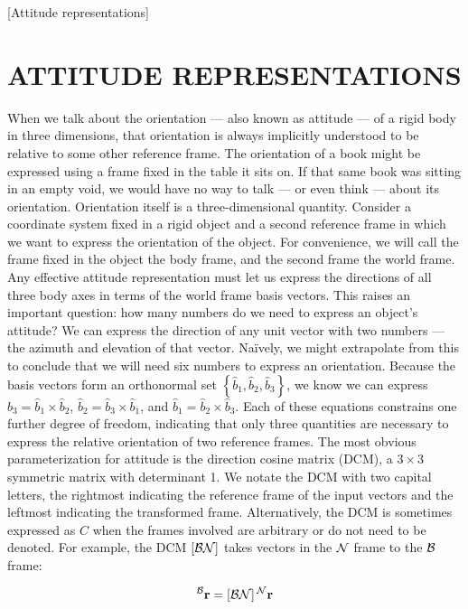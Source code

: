 [Attitude representations]

\chapter{ATTITUDE REPRESENTATIONS}

When we talk about the orientation ---  also known as attitude ---  of a rigid body in three dimensions, that orientation is always implicitly understood to be relative to some other reference frame. The orientation of a book might be expressed using a frame fixed in the table it sits on. If that same book was sitting in an empty void, we would have no way to talk ---  or even think ---  about its orientation. Orientation itself is a three-dimensional quantity. Consider a coordinate system fixed in a rigid object and a second reference frame in which we want to express the orientation of the object. For convenience, we will call the frame fixed in the object the body frame, and the second frame the world frame. Any effective attitude representation must let us express the directions of all three body axes in terms of the world frame basis vectors. This raises an important question: how many numbers do we need to express an object's attitude? We can express the direction of any unit vector with two numbers ---  the azimuth and elevation of that vector. Naïvely, we might extrapolate from this to conclude that we will need six numbers to express an orientation. Because the basis vectors form an orthonormal set $\left\{ \hat{b}_1, \hat{b}_2, \hat{b}_3\right\}$, we know we can express $\hat{b}_3 = \hat{b}_1 \times \hat{b}_2$, $\hat{b}_2 = \hat{b}_3 \times \hat{b}_1$, and $\hat{b}_1 = \hat{b}_2 \times \hat{b}_3$. Each of these equations constrains one further degree of freedom, indicating that only three quantities are necessary to express the relative orientation of two reference frames. The most obvious parameterization for attitude is the direction cosine matrix (DCM), a $3\times3$ symmetric matrix with determinant 1. We notate the DCM with two capital letters, the rightmost indicating the reference frame of the input vectors and the leftmost indicating the transformed frame. Alternatively, the DCM is sometimes expressed as $C$ when the frames involved are arbitrary or do not need to be denoted. For example, the DCM $\dcm{bn}$ takes vectors in the $\rf{n}$ frame to the $\rf{b}$ frame:

\begin{equation}
    \vrf{b}{r} = \dcm{bn} \vrf{n}{r}
\end{equation}

